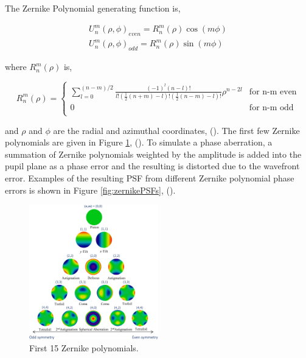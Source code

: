 The Zernike Polynomial generating function is,

\begin{equation}
    \begin{split}
        U_n^m(\rho,\phi)_{even}=R_n^m(\rho)\cos(m\phi) \\
        U_n^m(\rho,\phi)_{odd}=R_n^m(\rho)\sin(m\phi)
    \end{split}
\end{equation}

where $R_n^m(\rho)$ is,

\[ 
R_n^m(\rho)= \left\{
\begin{array}{cr}
       {\sum_{l=0}^{(n-m)/2} \frac{(-1)^l(n-l)!}{l!(\frac{1}{2}(n+m)-l)!(\frac{1}{2}(n-m)-l)!}\rho^{n-2l}} &  \mbox{for n-m even} \\
        {0} &  \mbox{for n-m odd} \\
\end{array} 
\right. 
\]

and $\rho$ and $\phi$ are the radial and azimuthal coordinates, (\cite{weisstein2002zernike}). The first few Zernike polynomials are given in Figure \ref{fig:zernikes}, (\cite{Hsieh:20}). To simulate a phase aberration, a summation of Zernike polynomials weighted by the amplitude is added into the pupil plane as a phase error and the resulting is distorted due to the wavefront error. Examples of the resulting PSF from different Zernike polynomial phase errors is shown in Figure \ref{fig:zernikePSFs}, (\cite{masalehdan2010modeling}).

\begin{figure}[h]
    \centering
    \includegraphics[width=0.5\textwidth]{Chapter Materials/Introduction Materials/Introduction Figures/zernikes.jpeg}
    \caption{First 15 Zernike polynomials.}
    \label{fig:zernikes}
\end{figure}


